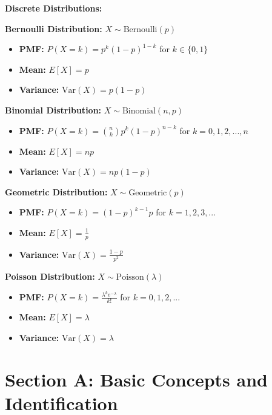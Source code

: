 \documentclass[
  11pt,
]{article}
\providecommand{\tightlist}{%
  \setlength{\itemsep}{0pt}\setlength{\parskip}{0pt}}\usepackage{longtable,booktabs,array}
\begin{document}
\textbf{Discrete Distributions:}

\textbf{Bernoulli Distribution:} \(X \sim \text{Bernoulli}(p)\)

\begin{itemize}
\tightlist
\item
  \textbf{PMF:} \(P(X = k) = p^k(1-p)^{1-k}\) for \(k \in \{0,1\}\)
\item
  \textbf{Mean:} \(E[X] = p\)
\item
  \textbf{Variance:} \(\text{Var}(X) = p(1-p)\)
\end{itemize}

\textbf{Binomial Distribution:} \(X \sim \text{Binomial}(n,p)\)

\begin{itemize}
\tightlist
\item
  \textbf{PMF:} \(P(X = k) = \binom{n}{k} p^k (1-p)^{n-k}\) for
  \(k = 0, 1, 2, ..., n\)
\item
  \textbf{Mean:} \(E[X] = np\)
\item
  \textbf{Variance:} \(\text{Var}(X) = np(1-p)\)
\end{itemize}

\textbf{Geometric Distribution:} \(X \sim \text{Geometric}(p)\)

\begin{itemize}
\tightlist
\item
  \textbf{PMF:} \(P(X = k) = (1-p)^{k-1} p\) for \(k = 1, 2, 3, ...\)
\item
  \textbf{Mean:} \(E[X] = \frac{1}{p}\)
\item
  \textbf{Variance:} \(\text{Var}(X) = \frac{1-p}{p^2}\)
\end{itemize}

\textbf{Poisson Distribution:} \(X \sim \text{Poisson}(\lambda)\)

\begin{itemize}
\tightlist
\item
  \textbf{PMF:} \(P(X = k) = \frac{\lambda^k e^{-\lambda}}{k!}\) for
  \(k = 0, 1, 2, ...\)
\item
  \textbf{Mean:} \(E[X] = \lambda\)
\item
  \textbf{Variance:} \(\text{Var}(X) = \lambda\)
\end{itemize}

\section{Section A: Basic Concepts and
Identification}\label{section-a-basic-concepts-and-identification}
\end{document}

